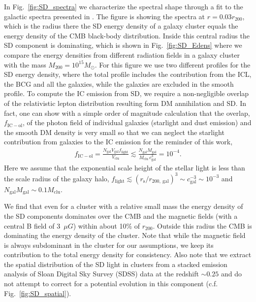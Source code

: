 \documentclass[10pt,aps,pra,reprint,amsmath,amsfonts,amssymb,showpacs,nofootinbib,floatfix]{revtex4-1}
\newcommand{\rmn}{\mathrm}
\newcommand{\msun}{M_\odot}
\newcommand{\rvir}{r_{200}}
\newcommand{\mvir}{M_{200}}
\begin{document}
In Fig.~\ref{fig:SD_spectra} we characterize the spectral shape
through a fit to the galactic spectra presented in
\cite{2006ApJ...648L..29P}.  The figure is showing the spectra at
$r=0.03\rvir$, which is the radius there the SD energy density of a
galaxy cluster equals the energy density of the CMB black-body
distribution. Inside this central radius the SD component is
dominating, which is shown in Fig.~\ref{fig:SD_Edens} where we compare
the energy densities from different radiation fields in a galaxy
cluster with the mass $\mvir=10^{15}\msun$. For this figure we use two
different profiles for the SD energy density, where the total profile
includes the contribution from the ICL, the BCG and all the galaxies,
while the galaxies are excluded in the smooth profile. To compute the
IC emission from SD, we require a non-negligible overlap of the
relativistic lepton distribution resulting form DM annihilation and
SD.  In fact, one can show with a simple order of magnitude
calculation that the overlap, $f_\rmn{IC-ol}$, of the photon field of individual
galaxies (starlight and dust emission) and the smooth DM density is
very small so that we can neglect the starlight contribution from
galaxies to the IC emission for the reminder of this work,
\begin{eqnarray}
f_\rmn{IC-ol} = \frac{N_\rmn{gal} V_\rmn{gal} f_\rmn{light}}{V_\rmn{clu}}
\lesssim  \frac{N_\rmn{gal} M_\rmn{gal}}{M_\rmn{clu}\,c_\rmn{gal}^{3}}=10^{-4}.
\end{eqnarray}
Here we assume that the exponential scale height of the stellar light
is less than the scale radius of the galaxy halo, $f_\rmn{light}
\lesssim (r_\rmn{s} / r_{200,~\rmn{gal}})^3 \sim c_\rmn{gal}^{-3} \sim
10^{-3}$ and $N_\rmn{gal} M_\rmn{gal} \sim 0.1 M_\rmn{clu}$.

We find that even for a cluster with a relative small mass the energy
density of the SD components dominates over the CMB and the magnetic
fields (with a central B field of 3~$\mu G$) within about 10\% of
$\rvir$. Outside this radius the CMB is dominating the energy density
of the cluster.  Note that while the magnetic field is always
subdominant in the cluster for our assumptions, we keep its
contribution to the total energy density for consistency. Also note
that we extract the spatial distribution of the SD light in clusters
from a stacked emission analysis of Sloan Digital Sky Survey (SDSS)
data at the redshift $\sim 0.25$ \cite{2005MNRAS.358..949Z} and do not
attempt to correct for a potential evolution in this component
(c.f. Fig.~\ref{fig:SD_spatial}).
\end{document}
